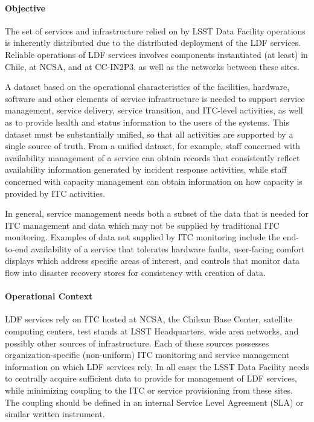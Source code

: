 \paragraph{Objective}

The set of services and infrastructure relied on by LSST Data Facility
operations is inherently distributed due to the distributed deployment of the
LDF services. Reliable operations of LDF services involves components
instantiated (at least) in Chile, at NCSA, and at CC-IN2P3, as well as the
networks between these sites.

A dataset based on the operational characteristics of the facilities, hardware,
software and other elements of service infrastructure is needed to support
service management, service delivery, service transition, and ITC-level
activities, as well as to provide health and status information to the users of
the systems. This dataset must be substantially unified, so that all activities
are supported by a single source of truth. From a unified dataset, for example,
staff concerned with availability management of a service can obtain records
that consistently reflect availability information generated by incident response
activities, while staff concerned with capacity management can obtain
information on how capacity is provided by ITC activities.

In general, service management needs both a subset of the data that is needed
for ITC management and data which may not be supplied by traditional ITC
monitoring. Examples of data not supplied by ITC monitoring include the
end-to-end availability of a service that tolerates hardware faults, user-facing
comfort displays which address specific areas of interest, and controls that
monitor data flow into disaster recovery stores for consistency with creation of data.

\paragraph{Operational Context}

LDF services rely on ITC hosted at NCSA, the Chilean Base Center, satellite
computing centers, test stands at LSST Headquarters, wide area networks, and
possibly other sources of infrastructure. Each of these sources possesses
organization-specific (non-uniform) ITC monitoring and service management
information on which LDF services rely. In all cases the LSST Data Facility needs
to centrally acquire sufficient data to provide for management of LDF services,
while minimizing coupling to the ITC or service provisioning from these sites.
The coupling should be defined in an internal Service Level Agreement (SLA) or
similar written instrument.

